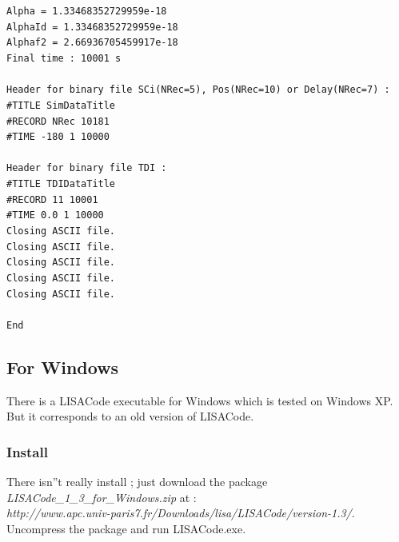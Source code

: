 \documentclass[a4paper,english,12pt]{article}
\begin{document}
\hphantom{a}\texttt{Alpha = 1.33468352729959e-18} \\
\hphantom{a}\texttt{AlphaId = 1.33468352729959e-18} \\
\hphantom{a}\texttt{Alphaf2 = 2.66936705459917e-18} \\
\texttt{Final time : 10001 s} \\
\hphantom{a}\\
\texttt{Header for binary file SCi(NRec=5), Pos(NRec=10) or Delay(NRec=7) :} \\
\texttt{\#TITLE SimDataTitle} \\
\texttt{\#RECORD NRec 10181} \\
\texttt{\#TIME -180 1 10000} \\
\hphantom{a} \\
\texttt{Header for binary file TDI :} \\
\texttt{\#TITLE TDIDataTitle} \\
\texttt{\#RECORD 11 10001} \\
\texttt{\#TIME 0.0 1 10000} \\
\hphantom{a}\texttt{Closing ASCII file.} \\
\hphantom{a}\texttt{Closing ASCII file.} \\
\hphantom{a}\texttt{Closing ASCII file.} \\
\hphantom{a}\texttt{Closing ASCII file.} \\
\hphantom{a}\texttt{Closing ASCII file.} \\
\hphantom{a} \\
\texttt{End} \\


%
%
\subsection{For Windows}
\label{SWindows}
There is a LISACode executable for Windows which is tested on Windows XP. But it corresponds to an old version of LISACode.
\subsubsection{Install}
\label{SSInstallWindows}
There isn''t really install ; just download the package {\it LISACode\_1\_3\_for\_Windows.zip}  at : \\
 {\it http://www.apc.univ-paris7.fr/Downloads/lisa/LISACode/version-1.3/}.\\
Uncompress the package and run  LISACode.exe.
\end{document}
